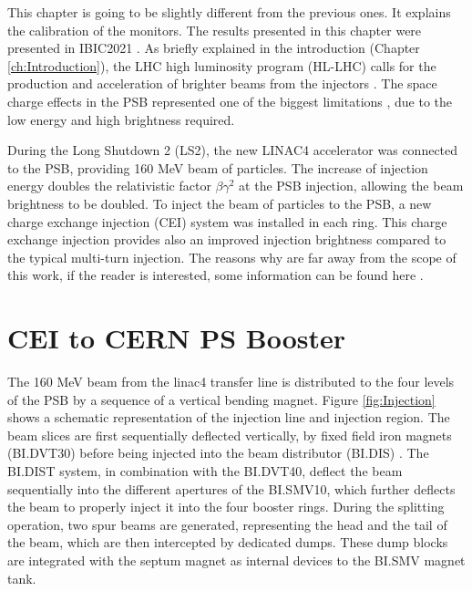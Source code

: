 \pagestyle{fancy}

\graphicspath{ {Figures/Chapter7_H0Hm/} }

This chapter is going to be slightly different from the previous ones. It explains the calibration of the \hzhm monitors. The results presented in this chapter were presented in IBIC2021 \parencite*[][]{ref:Ibic2021Araceli}. As briefly explained in the introduction (Chapter \ref{ch:Introduction}), the LHC high luminosity program (HL-LHC) \parencite[][]{ref:HL-LHC} calls for the production and acceleration of brighter beams from the injectors \parencite[][]{ref:InjectorsUpgrade}. The space charge effects in the PSB represented one of the biggest limitations \parencite[][]{ref:ChargeEffect}, due to the low energy and high brightness required.

During the Long Shutdown 2 (LS2), the new LINAC4 accelerator was connected to the PSB, providing 160 MeV \hm beam of particles. The increase of injection energy doubles the relativistic factor $\beta \gamma^2$ at the PSB injection, allowing the beam brightness to be doubled. To inject the \hm beam of particles to the PSB, a new charge exchange injection (CEI) system \parencite[][]{ref:ChargeExchange} was installed in each ring. This charge exchange injection provides also an improved injection brightness compared to the typical multi-turn injection. The reasons why are far away from the scope of this work, if the reader is interested, some information can be found here \parencite[][]{ref:liuvilleviolation}.

\section{CEI to CERN PS Booster}
\label{sec:CEI}

The 160 MeV beam from the linac4 transfer line is distributed to the four levels of the PSB by a sequence of a vertical bending magnet. Figure \ref{fig:Injection} shows a schematic representation of the injection line and injection region. The beam slices are first sequentially deflected vertically, by fixed field iron magnets (BI.DVT30) before being injected into the beam distributor (BI.DIS) \parencite[][]{ref:DIST}. The BI.DIST system, in combination with the BI.DVT40, deflect the beam sequentially into the different apertures of the BI.SMV10, which further deflects the beam to properly inject it into the four booster rings. During the splitting operation, two spur beams are generated, representing the head and the tail of the beam, which are then intercepted by dedicated dumps. These dump blocks are integrated with the septum magnet as internal devices to the BI.SMV magnet tank.

